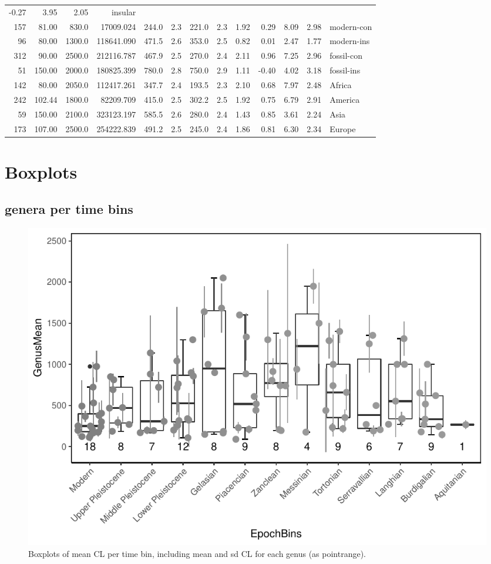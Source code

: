 \documentclass[]{article}
\begin{document}
\begin{longtable}[]{@{}rrrrrrrrrrrrl@{}}
-0.27 & 3.95 & 2.05 & insular\tabularnewline
157 & 81.00 & 830.0 & 17009.024 & 244.0 & 2.3 & 221.0 & 2.3 & 1.92 &
0.29 & 8.09 & 2.98 & modern-con\tabularnewline
96 & 80.00 & 1300.0 & 118641.090 & 471.5 & 2.6 & 353.0 & 2.5 & 0.82 &
0.01 & 2.47 & 1.77 & modern-ins\tabularnewline
312 & 90.00 & 2500.0 & 212116.787 & 467.9 & 2.5 & 270.0 & 2.4 & 2.11 &
0.96 & 7.25 & 2.96 & fossil-con\tabularnewline
51 & 150.00 & 2000.0 & 180825.399 & 780.0 & 2.8 & 750.0 & 2.9 & 1.11 &
-0.40 & 4.02 & 3.18 & fossil-ins\tabularnewline
142 & 80.00 & 2050.0 & 112417.261 & 347.7 & 2.4 & 193.5 & 2.3 & 2.10 &
0.68 & 7.97 & 2.48 & Africa\tabularnewline
242 & 102.44 & 1800.0 & 82209.709 & 415.0 & 2.5 & 302.2 & 2.5 & 1.92 &
0.75 & 6.79 & 2.91 & America\tabularnewline
59 & 150.00 & 2100.0 & 323123.197 & 585.5 & 2.6 & 280.0 & 2.4 & 1.43 &
0.85 & 3.61 & 2.24 & Asia\tabularnewline
173 & 107.00 & 2500.0 & 254222.839 & 491.2 & 2.5 & 245.0 & 2.4 & 1.86 &
0.81 & 6.30 & 2.34 & Europe\tabularnewline
\bottomrule
\end{longtable}

\newpage

\section{Boxplots}\label{boxplots}

\subsection{genera per time bins}\label{genera-per-time-bins}

\begin{figure}[htbp]
\centering
\includegraphics{MA_JJ_files/figure-latex/Boxplots of each genus per time bin-1.pdf}
\caption{Boxplots of mean CL per time bin, including mean and sd CL for
each genus (as pointrange).}
\end{figure}
\end{document}
